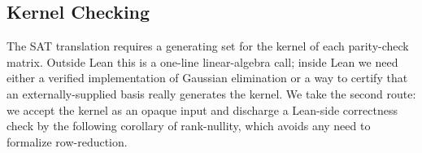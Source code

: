 %
%
%
%

\subsection{Kernel Checking}

%
%

The SAT translation requires a generating set for the kernel of each
parity-check matrix. Outside Lean this is a one-line linear-algebra call; inside
Lean we need either a verified implementation of Gaussian elimination or a way
to certify that an externally-supplied basis really generates the kernel. We
take the second route: we accept the kernel as an opaque input and discharge a
Lean-side correctness check by the following corollary of rank-nullity, which
avoids any need to formalize row-reduction.

